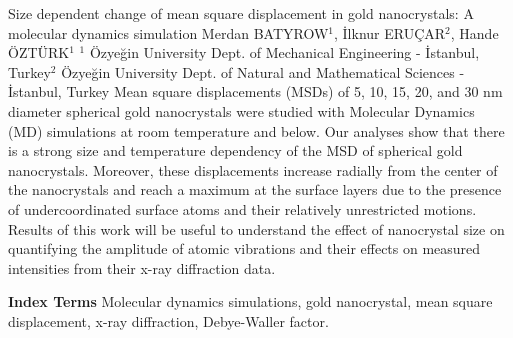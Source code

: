 
    \begin{abstract_online}{Size dependent change of mean square displacement in gold nanocrystals: A molecular dynamics simulation}{%
        Merdan BATYROW$^{1}$, İlknur ERUÇAR$^{2}$, Hande ÖZTÜRK$^{1}$}{%
        }{%
        $^1$ Özyeğin University Dept. of Mechanical Engineering - İstanbul, Turkey\newline{}$^2$ Özyeğin University Dept. of Natural and Mathematical Sciences - İstanbul, Turkey}
    Mean square displacements (MSDs) of 5, 10, 15, 20, and 30 nm diameter spherical gold nanocrystals were studied with Molecular Dynamics (MD) simulations at room temperature and below. Our analyses show that there is a strong size and temperature dependency of the MSD of spherical gold nanocrystals. Moreover, these displacements increase radially from the center of the nanocrystals and reach a maximum at the surface layers due to the presence of undercoordinated surface atoms and their relatively unrestricted motions. Results of this work will be useful to understand the effect of nanocrystal size on quantifying the amplitude of atomic vibrations and their effects on measured intensities from their x-ray diffraction data. 
    
            \textbf{Index Terms} \newline{}Molecular dynamics simulations, gold nanocrystal, mean square displacement, x-ray diffraction, Debye-Waller factor.
    \end{abstract_online}
    